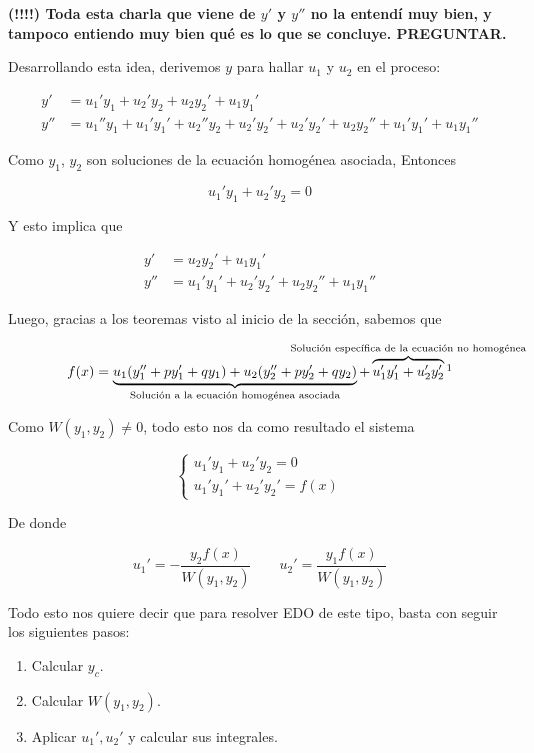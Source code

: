\textbf{(!!!!) Toda esta charla que viene de $y'$ y $y''$ no la entendí muy bien, y tampoco entiendo muy bien qué es lo que se concluye. PREGUNTAR.}

Desarrollando esta idea, derivemos $y$ para hallar $u_1$ y $u_2$ en el proceso:

\begin{equation*}
    \begin{aligned}
        y' &= u_1'y_1 + u_2'y_2 + u_2y_2' + u_1y_1' \\
        y'' &= u_1''y_1 + u_1'y_1' + u_2''y_2 + u_2'y_2' + u_2'y_2' + u_2y_2'' + u_1'y_1' + u_1y_1''
    \end{aligned}
\end{equation*}

Como $y_1$, $y_2$ son soluciones de la ecuación homogénea asociada, Entonces

\[
    u_1'y_1 + u_2'y_2 = 0
\]

Y esto implica que

\begin{equation*}
    \begin{aligned}
        y' &= u_2y_2' + u_1y_1' \\
        y'' &=  u_1'y_1' + u_2'y_2' + u_2y_2'' + u_1y_1''
    \end{aligned}
\end{equation*}

Luego, gracias a los teoremas visto al inicio de la sección, sabemos que

\[
    f(x) = \LaTeXunderbrace{u_1(y_1'' + py_1' + qy_1) + u_2(y_2'' + py_2' + qy_2)}_{\text{Solución a la ecuación homogénea asociada}} + \LaTeXoverbrace{u_1'y_1' + u_2'y_2'}^{\mathclap{\text{Solución específica de la ecuación no homogénea}}}\footnotemark
\]

Como $W(y_1, y_2) \neq 0$, todo esto nos da como resultado el sistema

\begin{equation}
    \begin{cases*}
        u_1'y_1 + u_2'y_2 = 0 \\
        u_1'y_1' + u_2'y_2' = f(x)
    \end{cases*}
\end{equation}

De donde

\[
    u_1' = -\frac{y_2f(x)}{W(y_1, y_2)} \qquad u_2' = \frac{y_1f(x)}{W(y_1, y_2)}
\]

Todo esto nos quiere decir que para resolver EDO de este tipo, basta con seguir los siguientes pasos:

\begin{enumerate}
    \item Calcular $y_c$.
    \item Calcular $W(y_1, y_2)$.
    \item Aplicar $u_1', u_2'$ y calcular sus integrales.
\end{enumerate}